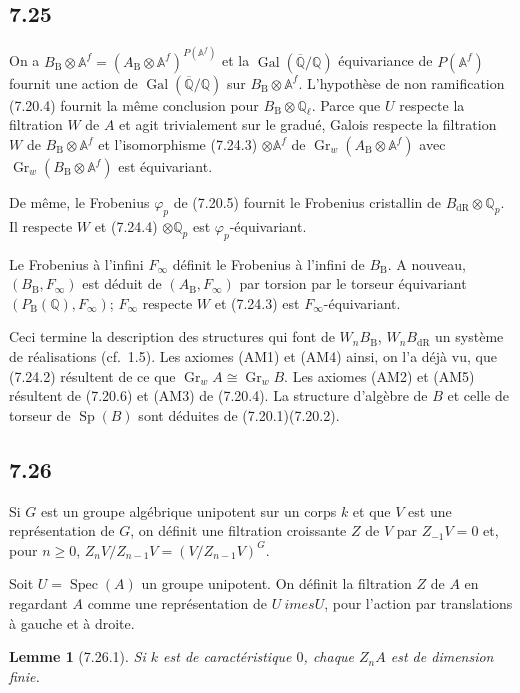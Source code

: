 \documentclass[12pt,a4paper]{article}
\theoremstyle{plain}
\newtheorem{lemma}[theorem]{Lemme}
\theoremstyle{definition}
\theoremstyle{remark}
\DeclareMathOperator{\Spec}{Spec}
\DeclareMathOperator{\Gal}{Gal}
\DeclareMathOperator{\Gr}{Gr}
\DeclareMathOperator{\Sp}{Sp}
\newcommand{\DR}{\mathrm{dR}}
\newcommand{\B}{\mathrm{B}}
\newcommand{\Q}{\mathbb{Q}}
\newcommand{\A}{\mathbb{A}}
\begin{document}
\subsection*{7.25}
On a $B_\B \otimes \A^f = (A_\B \otimes \A^f)^{P(\A^f)}$ et la $\Gal(\overline{\Q}/\Q)$ \'equivariance de $P(\A^f)$ fournit une action de $\Gal(\overline{\Q}/\Q)$ sur $B_\B \otimes \A^f$. L'hypoth\`ese de non ramification (7.20.4) fournit la m\^eme conclusion pour $B_\B \otimes \Q_\ell$. Parce que $U$ respecte la filtration $W$ de $A$ et agit trivialement sur le gradu\'e, Galois respecte la filtration $W$ de $B_\B \otimes \A^f$ et l'isomorphisme (7.24.3) $\otimes \A^f$ de $\Gr_w(A_\B \otimes \A^f)$ avec $\Gr_w(B_\B \otimes \A^f)$ est \'equivariant.

De m\^eme, le Frobenius $\varphi_p$ de (7.20.5) fournit le Frobenius cristallin de $B_\DR \otimes \Q_p$. Il respecte $W$ et (7.24.4) $\otimes \Q_p$ est $\varphi_p$-\'equivariant.

Le Frobenius \`a l'infini $F_\infty$ d\'efinit le Frobenius \`a l'infini de $B_\B$. A nouveau, $(B_\B, F_\infty)$ est d\'eduit de $(A_\B, F_\infty)$ par torsion par le torseur \'equivariant $(P_\B(\Q), F_\infty)$; $F_\infty$ respecte $W$ et (7.24.3) est $F_\infty$-\'equivariant.

Ceci termine la description des structures qui font de $W_nB_\B$, $W_nB_\DR$ un syst\`eme de r\'ealisations (cf.~1.5). Les axiomes (AM1) et (AM4) ainsi, on l'a d\'ej\`a vu, que (7.24.2) r\'esultent de ce que $\Gr_w A \cong \Gr_w B$. Les axiomes (AM2) et (AM5) r\'esultent de (7.20.6) et (AM3) de (7.20.4). La structure d'alg\`ebre de $B$ et celle de torseur de $\Sp(B)$ sont d\'eduites de (7.20.1)(7.20.2).

\subsection*{7.26}
Si $G$ est un groupe alg\'ebrique unipotent sur un corps $k$ et que $V$ est une repr\'esentation de $G$, on d\'efinit une filtration croissante $Z$ de $V$ par $Z_{-1}V = 0$ et, pour $n \geq 0$, $Z_nV/Z_{n-1}V = (V/Z_{n-1}V)^G$.

Soit $U = 
\Spec(A)$ un groupe unipotent. On d\'efinit la filtration $Z$ de $A$ en regardant $A$ comme une repr\'esentation de $U \	imes U$, pour l'action par translations \`a gauche et \`a droite.

\begin{lemma}[7.26.1]\label{lem:7.26.1}
Si $k$ est de caract\'eristique $0$, chaque $Z_nA$ est de dimension finie.
\end{lemma}
\end{document}
